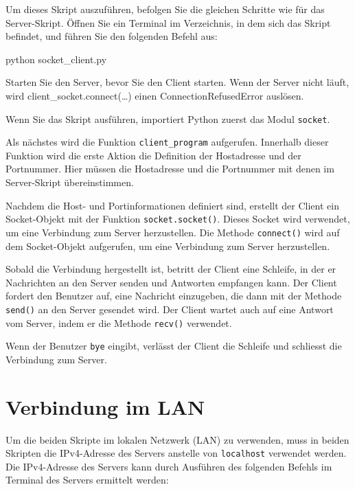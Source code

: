 \documentclass[
  nswissgerman,
  a4paper,
  DIV=11,
  numbers=noendperiod,
  ngerman]{scrreprt}
\newenvironment{Shaded}{\begin{snugshade}}{\end{snugshade}}
\newcommand{\ExtensionTok}[1]{\textcolor[rgb]{0.00,0.23,0.31}{#1}}
\newcommand{\NormalTok}[1]{\textcolor[rgb]{0.00,0.23,0.31}{#1}}
\begin{document}
Um dieses Skript auszuführen, befolgen Sie die gleichen Schritte wie für
das Server-Skript. Öffnen Sie ein Terminal im Verzeichnis, in dem sich
das Skript befindet, und führen Sie den folgenden Befehl aus:

\begin{Shaded}
\begin{Highlighting}[numbers=left,,]
\ExtensionTok{python}\NormalTok{ socket\_client.py}
\end{Highlighting}
\end{Shaded}

Starten Sie den Server, bevor Sie den Client starten. Wenn der Server
nicht läuft, wird client\_socket.connect(\ldots) einen
ConnectionRefusedError auslösen.

Wenn Sie das Skript ausführen, importiert Python zuerst das Modul
\texttt{socket}.

Als nächstes wird die Funktion \texttt{client\_program} aufgerufen.
Innerhalb dieser Funktion wird die erste Aktion die Definition der
Hostadresse und der Portnummer. Hier müssen die Hostadresse und die
Portnummer mit denen im Server-Skript übereinstimmen.

Nachdem die Host- und Portinformationen definiert sind, erstellt der
Client ein Socket-Objekt mit der Funktion \texttt{socket.socket()}.
Dieses Socket wird verwendet, um eine Verbindung zum Server
herzustellen. Die Methode \texttt{connect()} wird auf dem Socket-Objekt
aufgerufen, um eine Verbindung zum Server herzustellen.

Sobald die Verbindung hergestellt ist, betritt der Client eine Schleife,
in der er Nachrichten an den Server senden und Antworten empfangen kann.
Der Client fordert den Benutzer auf, eine Nachricht einzugeben, die dann
mit der Methode \texttt{send()} an den Server gesendet wird. Der Client
wartet auch auf eine Antwort vom Server, indem er die Methode
\texttt{recv()} verwendet.

Wenn der Benutzer \texttt{bye} eingibt, verlässt der Client die Schleife
und schliesst die Verbindung zum Server.

\section{Verbindung im LAN}\label{verbindung-im-lan}

Um die beiden Skripte im lokalen Netzwerk (LAN) zu verwenden, muss in
beiden Skripten die IPv4-Adresse des Servers anstelle von
\texttt{localhost} verwendet werden.\\
Die IPv4-Adresse des Servers kann durch Ausführen des folgenden Befehls
im Terminal des Servers ermittelt werden:
\end{document}
